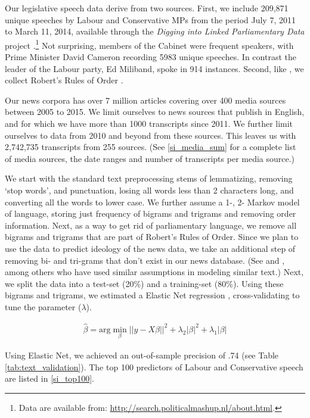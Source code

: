 \documentclass[12pt, letterpaper]{article}
\begin{document}
Our legislative speech data derive from two sources. First, we include 209,871 unique speeches by Labour and Conservative MPs from the period July 7, 2011 to March 11, 2014, available through the \textit{Digging into Linked Parliamentary Data} project \citep{marx2009advanced}.\footnote{Data are available from: \url{http://search.politicalmashup.nl/about.html}.} Not surprising, members of the Cabinet were frequent speakers, with Prime Minister David Cameron recording 5983 unique speeches. In contrast the leader of the Labour party, Ed Miliband, spoke in 914 instances. Second, like \citet{gentzkow2015measuring}, we collect Robert's Rules of Order \citep{henry2011robert}.

Our news corpora has over 7 million articles covering over 400 media sources between 2005 to 2015. We limit ourselves to news sources that publish in English, and for which we have more than 1000 transcripts since 2011. We further limit ourselves to data from 2010 and beyond from these sources. This leaves us with 2,742,735 transcripts from 255 sources. (See \ref{si_media_sum} for a complete list of media sources, the date ranges and number of transcripts per media source.)

We start with the standard text preprocessing stems of lemmatizing, removing `stop words', and punctuation, losing all words less than 2 characters long, and converting all the words to lower case. We further assume a 1-, 2- Markov model of language, storing just frequency of bigrams and trigrams and removing order information. Next, as a way to get rid of parliamentary language, we remove all bigrams and trigrams that are part of Robert's Rules of Order. Since we plan to use the data to predict ideology of the news data, we take an additional step of removing bi- and tri-grams that don't exist in our news database. (See \citet{gentzkow2010} and \citet{martin2014}, among others who have used similar assumptions in modeling similar text.)  Next, we split the data into a test-set (20\%) and a training-set (80\%). Using these bigrams and trigrams, we estimated a Elastic Net regression \citep{zou2005regularization}, cross-validating to tune the parameter ($\lambda$).

\begin{align}
   \hat{\beta} = \text{arg} \min_{\beta} \lvert\lvert y - X\beta \rvert\rvert^2 + \lambda_2 \lvert\beta\rvert^2 + \lambda_1 \lvert\beta\rvert
\end{align}

Using Elastic Net, we achieved an out-of-sample precision of .74 (see Table \ref{tab:text_validation}). The top 100 predictors of Labour and Conservative speech are listed in \ref{si_top100}.  
\end{document}
